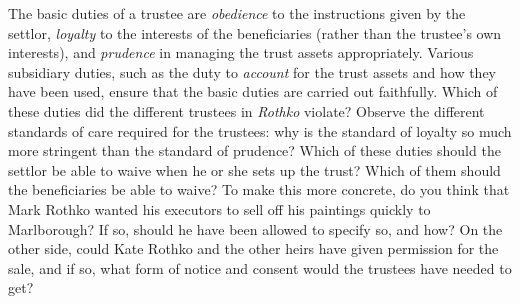 \item The basic duties of a trustee are \textit{obedience} to the instructions
given by the settlor, \textit{loyalty} to the interests of the beneficiaries
(rather than the trustee's own interests), and \textit{prudence} in managing the
trust assets appropriately. Various subsidiary duties, such as the duty to
\textit{account} for the trust assets and how they have been used, ensure that
the basic duties are carried out faithfully. Which of these duties did the
different trustees in \textit{Rothko} violate? Observe the different standards
of care required for the trustees: why is the standard of loyalty so much more
stringent than the standard of prudence? Which of these duties should the
settlor be able to waive when he or she sets up the trust? Which of them should
the beneficiaries be able to waive? To make this more concrete, do you think
that Mark Rothko wanted his executors to sell off his paintings quickly to
Marlborough? If so, should he have been allowed to specify so, and how? On the
other side, could Kate Rothko and the other heirs have given permission for the
sale, and if so, what form of notice and consent would the trustees have needed
to get?

